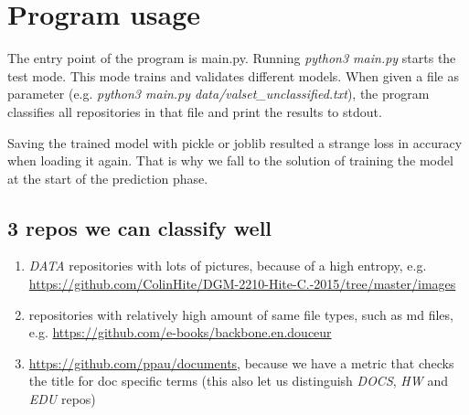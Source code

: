 \documentclass[a4paper]{scrartcl}
\begin{document}
\section{Program usage}
The entry point of the program is main.py. Running \textit{python3 main.py} starts the test mode. This mode trains and validates different models. When given a file as parameter (e.g. \textit{python3 main.py data/valset\_unclassified.txt}), the program classifies all repositories in that file and print the results to stdout.

Saving the trained model with pickle or joblib resulted a strange loss in accuracy when loading it again. That is why we fall to the solution of training the model at the start of the prediction phase.

\subsection{3 repos we can classify well} %
\label{sub:3_repos_we_can_classify_well}

\begin{enumerate}
	\item \emph{DATA} repositories with lots of pictures, because of a high entropy, e.g. \url{https://github.com/ColinHite/DGM-2210-Hite-C.-2015/tree/master/images}
	\item repositories with relatively high amount of same file types, such as md files, e.g. \url{https://github.com/e-books/backbone.en.douceur}
	\item \url{https://github.com/ppau/documents}, because we have a metric that checks the title for doc specific terms (this also let us distinguish \emph{DOCS}, \emph{HW} and \emph{EDU} repos)
\end{enumerate}

\end{document}
